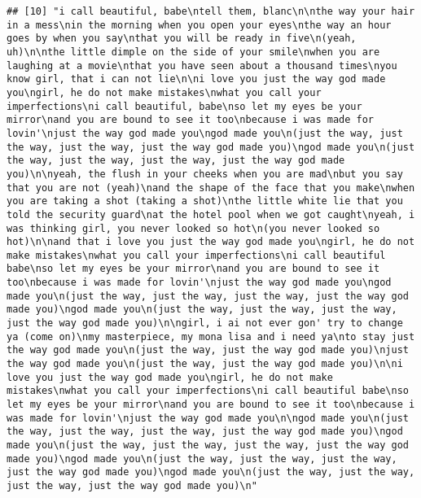 \documentclass[]{article}
\begin{document}
\begin{verbatim}
## [10] "i call beautiful, babe\ntell them, blanc\n\nthe way your hair in a mess\nin the morning when you open your eyes\nthe way an hour goes by when you say\nthat you will be ready in five\n(yeah, uh)\n\nthe little dimple on the side of your smile\nwhen you are laughing at a movie\nthat you have seen about a thousand times\nyou know girl, that i can not lie\n\ni love you just the way god made you\ngirl, he do not make mistakes\nwhat you call your imperfections\ni call beautiful, babe\nso let my eyes be your mirror\nand you are bound to see it too\nbecause i was made for lovin'\njust the way god made you\ngod made you\n(just the way, just the way, just the way, just the way god made you)\ngod made you\n(just the way, just the way, just the way, just the way god made you)\n\nyeah, the flush in your cheeks when you are mad\nbut you say that you are not (yeah)\nand the shape of the face that you make\nwhen you are taking a shot (taking a shot)\nthe little white lie that you told the security guard\nat the hotel pool when we got caught\nyeah, i was thinking girl, you never looked so hot\n(you never looked so hot)\n\nand that i love you just the way god made you\ngirl, he do not make mistakes\nwhat you call your imperfections\ni call beautiful babe\nso let my eyes be your mirror\nand you are bound to see it too\nbecause i was made for lovin'\njust the way god made you\ngod made you\n(just the way, just the way, just the way, just the way god made you)\ngod made you\n(just the way, just the way, just the way, just the way god made you)\n\ngirl, i ai not ever gon' try to change ya (come on)\nmy masterpiece, my mona lisa and i need ya\nto stay just the way god made you\n(just the way, just the way god made you)\njust the way god made you\n(just the way, just the way god made you)\n\ni love you just the way god made you\ngirl, he do not make mistakes\nwhat you call your imperfections\ni call beautiful babe\nso let my eyes be your mirror\nand you are bound to see it too\nbecause i was made for lovin'\njust the way god made you\n\ngod made you\n(just the way, just the way, just the way, just the way god made you)\ngod made you\n(just the way, just the way, just the way, just the way god made you)\ngod made you\n(just the way, just the way, just the way, just the way god made you)\ngod made you\n(just the way, just the way, just the way, just the way god made you)\n"                                                                                                                                                                                                                                                                                                                                                                                                                                                                                             

\end{verbatim}
\end{document}
